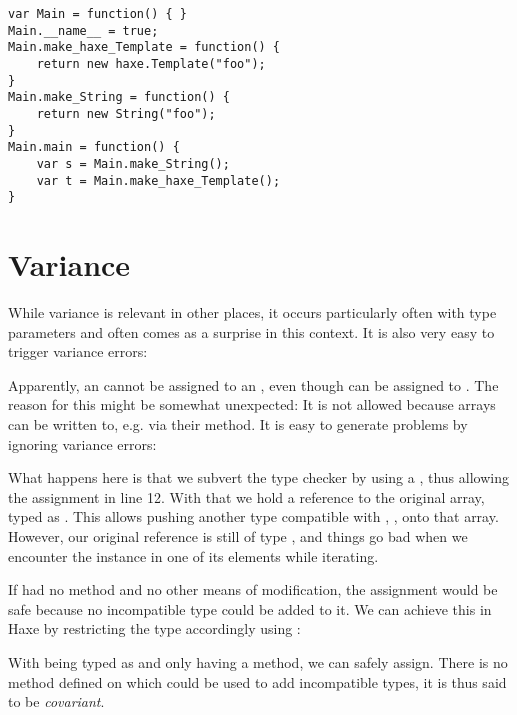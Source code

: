 \documentclass{haxe}
\begin{document}
\begin{lstlisting}
var Main = function() { }
Main.__name__ = true;
Main.make_haxe_Template = function() {
	return new haxe.Template("foo");
}
Main.make_String = function() {
	return new String("foo");
}
Main.main = function() {
	var s = Main.make_String();
	var t = Main.make_haxe_Template();
}
\end{lstlisting}

\section{Variance}
\label{type-system-variance}

While variance is relevant in other places, it occurs particularly often with type parameters and often comes as a surprise in this context. It is also very easy to trigger variance errors:


Apparently, an  cannot be assigned to an , even though  can be assigned to . The reason for this might be somewhat unexpected: It is not allowed because arrays can be written to, e.g. via their  method. It is easy to generate problems by ignoring variance errors:


What happens here is that we subvert the type checker by using a , thus allowing the assignment in line 12. With that we hold a reference  to the original array, typed as . This allows pushing another type compatible with , , onto that array. However, our original reference  is still of type , and things go bad when we encounter the  instance in one of its elements while iterating.

If  had no  method and no other means of modification, the assignment would be safe because no incompatible type could be added to it. We can achieve this in Haxe by restricting the type accordingly using :


With  being typed as  and  only having a  method, we can safely assign. There is no method defined on  which could be used to add incompatible types, it is thus said to be \emph{covariant}.
\end{document}
